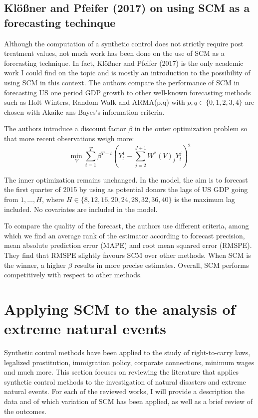\documentclass[12pt,a4paper,draft]{article}
\begin{document}
\subsection{Klößner and Pfeifer (2017) on using SCM as a forecasting techinque}
Although the computation of a synthetic control does not strictly require post treatment
values, not much work has been done on the use of SCM as a forecasting technique.
In fact, Klößner and Pfeifer (2017) is the only academic work I could find on the 
topic and is mostly an introduction to the possibility of using SCM in this context. 
The authors compare the performance of SCM in forecasting US one period GDP growth 
to other well-known forecasting methods such as Holt-Winters, Random Walk and 
ARMA(p,q) with $p,q\in\{ 0,1,2,3,4\}$ are chosen with Akaike ans Bayes's information 
criteria.

The authors introduce a discount factor $\beta$ in the outer optimization problem 
so that more recent observations weigh more:
\begin{equation}
    \min_{V} 
    \sum_{t=1}^{T} {\beta^{T-t} \left( Y^1_t - 
    \sum_{j=2}^{J+1} {W^*(V)_j Y^j_t} \right)^2}
\end{equation}

The inner optimization remains unchanged. 
In the model, the aim is to forecast the first quarter of 2015 by using as 
potential donors the lags of US GDP going 
from $1, \dots, H$, where $H\in\{8,12,16,20,24,28,32,36,40\}$ is 
the maximum lag included. No covariates are included in the model. 

To compare the quality of the forecast, the authors use different criteria, among 
which we find an average rank of the estimator according to forecast precision,
mean absolute prediction error (MAPE) and root mean squared error (RMSPE).
They find that RMSPE slightly favours SCM over other methods. When SCM is the 
winner, a higher $\beta$ results in more precise estimates. Overall, SCM performs 
competitively with respect to other methods. 



\section{Applying SCM to the analysis of extreme natural events}  %
Synthetic control methods have been applied to the study of right-to-carry laws, 
legalized prostitution, immigration policy, corporate connections, minimum wages and 
much more. This section focuses on reviewing the literature that applies synthetic 
control methods to the investigation of natural disasters and extreme natural 
events. For each of the reviewed works, I will provide a description the data 
and of which variation of SCM has been applied, as well as a brief review of 
the outcomes. 
\end{document}
